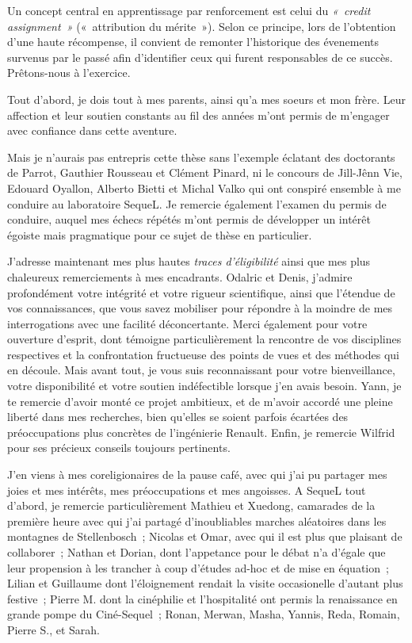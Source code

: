 
\begin{acknowledgements}
Un concept central en apprentissage par renforcement est celui du \emph{«~credit assignment~»} («~attribution du mérite~»). Selon ce principe, lors de l'obtention d'une haute récompense, il convient de remonter l'historique des évenements survenus par le passé afin d'identifier ceux qui furent responsables de ce succès.
Prêtons-nous à l'exercice.

Tout d'abord, je dois tout à mes parents, ainsi qu'a mes soeurs et mon frère. Leur affection et leur soutien constants au fil des années m'ont permis de m'engager avec confiance dans cette aventure.

Mais je n'aurais pas entrepris cette thèse sans l'exemple éclatant des doctorants de Parrot, Gauthier Rousseau et Clément Pinard, ni le concours de Jill-Jênn Vie, Edouard Oyallon, Alberto Bietti et Michal Valko qui ont conspiré ensemble à me conduire au laboratoire SequeL. Je remercie également l'examen du permis de conduire, auquel mes échecs répétés m'ont permis de développer un intérêt égoiste mais pragmatique pour ce sujet de thèse en particulier.

J'adresse maintenant mes plus hautes \emph{traces d'éligibilité} ainsi que mes plus chaleureux remerciements à mes encadrants. Odalric et Denis, j'admire profondément votre intégrité et votre rigueur scientifique, ainsi que l'étendue de vos connaissances, que vous savez mobiliser pour répondre à la moindre de mes interrogations avec une facilité déconcertante. Merci également pour votre ouverture d'esprit, dont témoigne particulièrement la rencontre de vos disciplines respectives et la confrontation fructueuse des points de vues et des méthodes qui en découle. Mais avant tout, je vous suis reconnaissant pour votre bienveillance, votre disponibilité et votre soutien indéfectible lorsque j'en avais besoin.
Yann, je te remercie d'avoir monté ce projet ambitieux, et de m'avoir accordé une pleine liberté dans mes recherches, bien qu'elles se soient parfois écartées des préoccupations plus concrètes de l'ingénierie Renault. Enfin, je remercie Wilfrid pour ses précieux conseils toujours pertinents.

J'en viens à mes coreligionaires de la pause café, avec qui j'ai pu partager mes joies et mes intérêts, mes préoccupations et mes angoisses. A SequeL tout d'abord, je remercie particulièrement Mathieu et Xuedong, camarades de la première heure avec qui j'ai partagé d'inoubliables marches aléatoires dans les montagnes de Stellenbosch~; Nicolas et Omar, avec qui il est plus que plaisant de collaborer~; 
Nathan et Dorian, dont l'appetance pour le débat n'a d'égale que leur propension à les trancher à coup d'études ad-hoc et de mise en équation~;  Lilian et Guillaume dont l'éloignement rendait la visite occasionelle d'autant plus festive~; Pierre M. dont la cinéphilie et l'hospitalité ont permis la renaissance en grande pompe du Ciné-Sequel~; Ronan, Merwan, Masha, Yannis, Reda, Romain, Pierre S., et Sarah. 


\end{acknowledgements}
